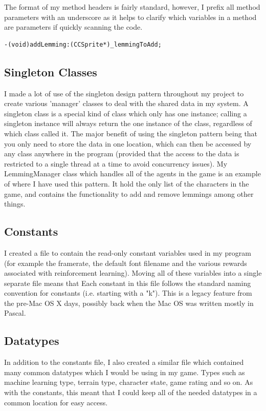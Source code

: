 \documentclass[a4paper,oneside]{report}
\begin{document}
The format of my method headers is fairly standard, however, I prefix all method parameters with an underscore as it helps to clarify which variables in a method are parameters if quickly scanning the code.

\begin{lstlisting}
-(void)addLemming:(CCSprite*)_lemmingToAdd;
\end{lstlisting}


\subsection{Singleton Classes} 

I made a lot of use of the singleton design pattern throughout my project to create various 'manager' classes to deal with the shared data in my system. A singleton class is a special kind of class which only has one instance; calling a singleton instance will always return the one instance of the class, regardless of which class called it. The major benefit of using the singleton pattern being that you only need to store the data in one location, which can then be accessed by any class anywhere in the program (provided that the access to the data is restricted to a single thread at a time to avoid concurrency issues). My LemmingManager class which handles all of the agents in the game is an example of where I have used this pattern. It hold the only list of the characters in the game, and contains the functionality to add and remove lemmings among other things.

\subsection{Constants} 

I created a file to contain the read-only constant variables used in my program (for example the framerate, the default font filename and the various rewards associated with reinforcement learning). Moving all of these variables into a single separate file means that Each constant in this file follows the standard naming convention for constants (i.e. starting with a "k"). This is a legacy feature from the pre-Mac OS X days, possibly back when the Mac OS was written mostly in Pascal. 

\subsection{Datatypes} 

In addition to the constants file, I also created a similar file which contained many common datatypes which I would be using in my game. Types such as machine learning type, terrain type, character state, game rating and so on. As with the constants, this meant that I could keep all of the needed datatypes in a common location for easy access.
\end{document}
